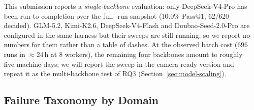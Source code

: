 This submission reports a \emph{single-backbone} evaluation: only DeepSeek-V4-Pro
has been run to completion over the full \Neval{}-run snapshot (10.0\% Pass@1,
62/620 decided). GLM-5.2, Kimi-K2.6, DeepSeek-V4-Flash and Doubao-Seed-2.0-Pro
are configured in the same harness but their sweeps are still running, so we
report no numbers for them rather than a table of dashes. At the observed batch
cost (696 runs in $\approx$24\,h at 8 workers), the remaining four backbones
amount to roughly five machine-days; we will report the sweep in the
camera-ready version and repeat it as the multi-backbone test of RQ3
(Section~\ref{sec:model-scaling}).

\subsection{Failure Taxonomy by Domain}
\label{sec:failure-by-domain}

